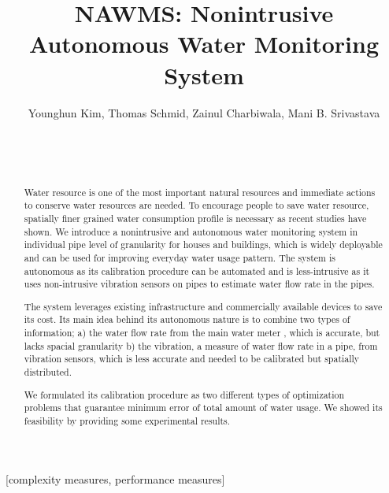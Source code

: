 \documentclass[10pt]{sigplan-proc-varsize}
\author{
      \alignauthor Younghun Kim, Thomas Schmid, Zainul Charbiwala, Mani B. Srivastava   \\  
%
%
%
      \sharedaffiliation
     \affaddr{Networked and Embedded Systems Lab.}  \\
     \affaddr{Electrical Engineering Department}  \\
      \affaddr{University of California, Los Angeles}\\
      \email{\{kimyh,thomas.schmid,zainul,mbs\}@ucla.edu}
    }
\title{NAWMS: Nonintrusive Autonomous Water Monitoring System}
\begin{document}
\maketitle


\begin{abstract}
Water resource is one of the most important natural resources and immediate actions to conserve water resources are needed. To encourage people to save water resource, spatially finer grained water consumption profile is necessary as recent studies have shown. We introduce a nonintrusive and autonomous water monitoring system in individual pipe level of granularity for houses and buildings, which is widely deployable and can be used for improving everyday water usage pattern. The system is autonomous as its calibration procedure can be automated and is less-intrusive as it uses non-intrusive vibration sensors on pipes to estimate water flow rate in the pipes.

The system leverages existing infrastructure and commercially available devices to save its cost. Its main idea behind its autonomous nature is to combine two types of information; a) the water flow rate from the main water meter , which is accurate, but lacks spacial granularity b) the vibration, a measure of water flow rate in a pipe, from vibration sensors, which is less accurate and needed to be calibrated but spatially distributed.

We formulated its calibration procedure as two different types of optimization problems that guarantee minimum error of total amount of water usage. We showed its feasibility by providing some experimental results.

\end{abstract}

[complexity measures, performance measures]















\end{document}
